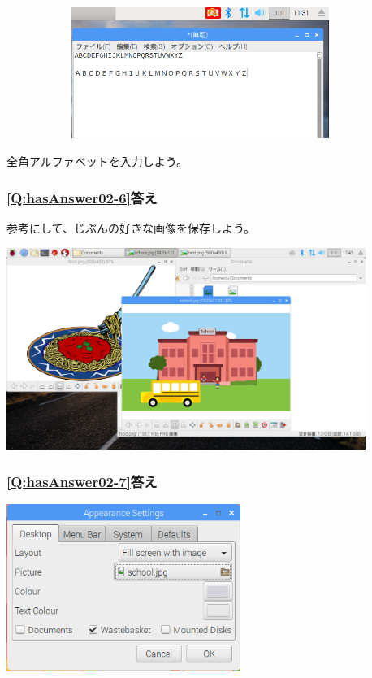 \documentclass[a4paper,12pt]{jarticle}
\begin{document}
\bigskip

\bigskip


\centering
\includegraphics[width=12.631cm,height=4.297cm]{textbook-img220.png}
\flushleft

\bigskip

全角アルファベットを入力しよう。
\clearpage

\subsubsection{\bfseries
\ref*{Q:hasAnswer02-6}答え}

参考にして、じぶんの好きな画像を保存しよう。

\centering
\includegraphics[width=11.705cm,height=6.581cm]{textbook-img221.png}
\flushleft

\bigskip


\subsubsection{\bfseries
\ref*{Q:hasAnswer02-7}答え}



\centering
\includegraphics[width=7.631cm,height=5.44cm]{textbook-img222.png}
\end{document}
